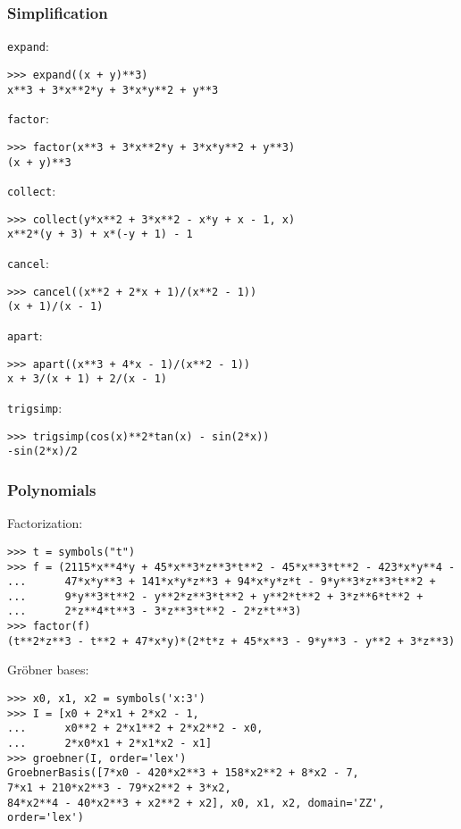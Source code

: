 
\subsubsection{Simplification}
\noindent \texttt{expand}:
\begin{verbatim}
>>> expand((x + y)**3)
x**3 + 3*x**2*y + 3*x*y**2 + y**3
\end{verbatim}

\noindent \texttt{factor}:
\begin{verbatim}
>>> factor(x**3 + 3*x**2*y + 3*x*y**2 + y**3)
(x + y)**3
\end{verbatim}

\noindent \texttt{collect}:
\begin{verbatim}
>>> collect(y*x**2 + 3*x**2 - x*y + x - 1, x)
x**2*(y + 3) + x*(-y + 1) - 1
\end{verbatim}

\noindent \texttt{cancel}:
\begin{verbatim}
>>> cancel((x**2 + 2*x + 1)/(x**2 - 1))
(x + 1)/(x - 1)
\end{verbatim}

\noindent \texttt{apart}:
\begin{verbatim}
>>> apart((x**3 + 4*x - 1)/(x**2 - 1))
x + 3/(x + 1) + 2/(x - 1)
\end{verbatim}

\noindent \texttt{trigsimp}:
\begin{verbatim}
>>> trigsimp(cos(x)**2*tan(x) - sin(2*x))
-sin(2*x)/2
\end{verbatim}


\subsubsection{Polynomials}
\noindent Factorization:
\begin{verbatim}
>>> t = symbols("t")
>>> f = (2115*x**4*y + 45*x**3*z**3*t**2 - 45*x**3*t**2 - 423*x*y**4 -
...      47*x*y**3 + 141*x*y*z**3 + 94*x*y*z*t - 9*y**3*z**3*t**2 +
...      9*y**3*t**2 - y**2*z**3*t**2 + y**2*t**2 + 3*z**6*t**2 +
...      2*z**4*t**3 - 3*z**3*t**2 - 2*z*t**3)
>>> factor(f)
(t**2*z**3 - t**2 + 47*x*y)*(2*t*z + 45*x**3 - 9*y**3 - y**2 + 3*z**3)
\end{verbatim}

\noindent Gr\"{o}bner bases:
\begin{verbatim}
>>> x0, x1, x2 = symbols('x:3')
>>> I = [x0 + 2*x1 + 2*x2 - 1,
...      x0**2 + 2*x1**2 + 2*x2**2 - x0,
...      2*x0*x1 + 2*x1*x2 - x1]
>>> groebner(I, order='lex')
GroebnerBasis([7*x0 - 420*x2**3 + 158*x2**2 + 8*x2 - 7,
7*x1 + 210*x2**3 - 79*x2**2 + 3*x2,
84*x2**4 - 40*x2**3 + x2**2 + x2], x0, x1, x2, domain='ZZ', order='lex')
\end{verbatim}

